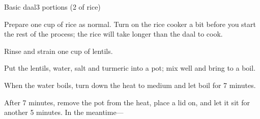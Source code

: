 \documentclass{article}
\begin{document}
  \begin{recipe}{Basic daal}{3 portions (2 of rice)}
    \begin{step}
      \begin{ingrs}
      \end{ingrs}
      \begin{stepdesc}
        Prepare one cup of rice as normal. Turn on the rice cooker a bit before you start the rest of the process; the rice will take longer than the daal to cook.
      \end{stepdesc}
    \end{step}
    \begin{step}
      \begin{ingrs}
      \end{ingrs}
      \begin{stepdesc}
        Rinse and strain one cup of lentils.
      \end{stepdesc}
    \end{step}
    \begin{step}
      \begin{ingrs}
      \end{ingrs}
      \begin{stepdesc}
        Put the lentils, water, salt and turmeric into a pot; mix well and bring to a boil.
      \end{stepdesc}
    \end{step}
    \begin{step}
      \begin{ingrs}
      \end{ingrs}
      \begin{stepdesc}
        When the water boils, turn down the heat to medium and let boil for 7 minutes.
      \end{stepdesc}
    \end{step}
    \begin{step}
      \begin{ingrs}
      \end{ingrs}
      \begin{stepdesc}
        After 7 minutes, remove the pot from the heat, place a lid on, and let it sit for another 5 minutes. In the meantime---

\end{stepdesc}
\end{step}
\end{recipe}
\end{document}
